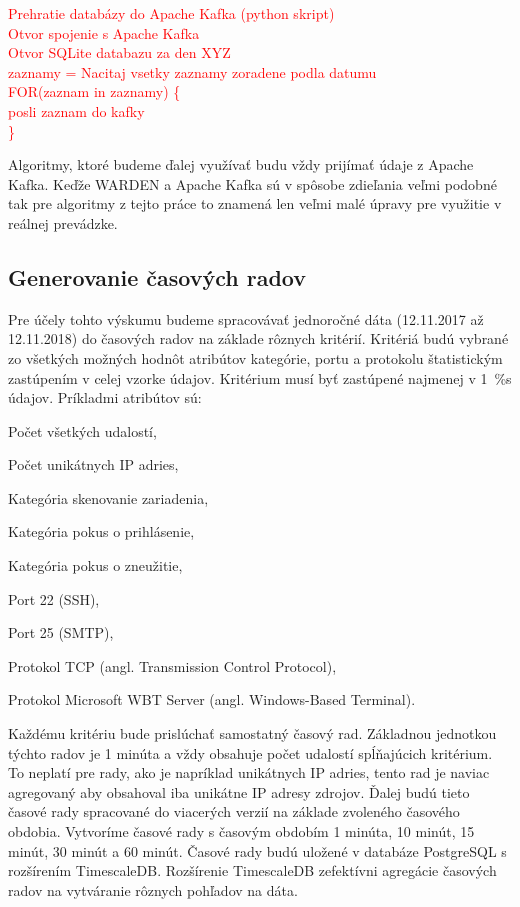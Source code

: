 \documentclass[thesismargins, thesislinespacing, openright, upjsfrontpage, combineabstracts]{rnthesis}
\begin{document}
\textcolor{red}{Prehratie databázy do Apache Kafka (python skript)\\
Otvor spojenie s Apache Kafka\\
Otvor SQLite databazu za den XYZ\\
zaznamy = Nacitaj vsetky zaznamy zoradene podla datumu\\
FOR(zaznam in zaznamy) \{\\
posli zaznam do kafky\\
\}}

Algoritmy, ktoré budeme ďalej využívať budu vždy prijímať údaje z Apache Kafka. Keďže WARDEN a Apache Kafka sú v spôsobe zdieľania veľmi podobné tak pre algoritmy z tejto práce to znamená len veľmi malé úpravy pre využitie v reálnej prevádzke.

\subsection{Generovanie časových radov}

Pre účely tohto výskumu budeme spracovávať jednoročné dáta (12.11.2017 až 12.11.2018) do časových radov na základe rôznych kritérií. Kritériá budú vybrané zo všetkých možných hodnôt atribútov kategórie, portu a protokolu štatistickým zastúpením v celej vzorke údajov. Kritérium musí byť zastúpené najmenej v 1~\%s údajov. Príkladmi atribútov sú: 
\begin{compactenum}
    \item Počet všetkých udalostí,
    \item Počet unikátnych IP adries,
    \item Kategória skenovanie zariadenia,
    \item Kategória pokus o prihlásenie,
    \item Kategória pokus o zneužitie,
    \item Port 22 (SSH),
    \item Port 25 (SMTP),
    \item Protokol TCP (angl. Transmission Control Protocol),
    \item Protokol Microsoft WBT Server (angl. Windows-Based Terminal).
\end{compactenum}

Každému kritériu bude prislúchať samostatný časový rad. Základnou jednotkou týchto radov je 1 minúta a vždy obsahuje počet udalostí spĺňajúcich kritérium. To neplatí pre rady, ako je napríklad unikátnych IP adries, tento rad je naviac agregovaný aby obsahoval iba unikátne IP adresy zdrojov. Ďalej budú tieto časové rady spracované do viacerých verzií na základe zvoleného časového obdobia. Vytvoríme časové rady s časovým obdobím 1 minúta, 10 minút, 15 minút, 30 minút a 60 minút. Časové rady budú uložené v databáze PostgreSQL s rozšírením TimescaleDB. Rozšírenie TimescaleDB zefektívni agregácie časových radov na vytváranie rôznych pohľadov na dáta.
\end{document}
